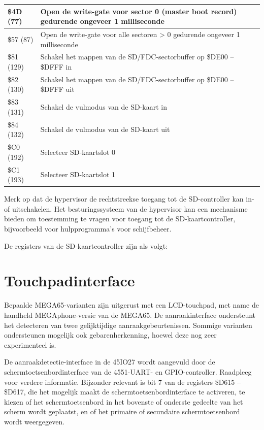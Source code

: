 \begin{longtable}{|L{2cm}|L{9cm}|}
\small \$4D (77) & Open de write-gate voor sector 0 (master boot record) gedurende ongeveer 1 milliseconde \\
 \hline
\small \$57 (87) & Open de write-gate voor alle sectoren > 0 gedurende ongeveer 1 milliseconde \\
 \hline
\small \$81 (129) & Schakel het mappen van de SD/FDC-sectorbuffer op \$DE00 -- \$DFFF in \\
 \hline
\small \$82 (130) & Schakel het mappen van de SD/FDC-sectorbuffer op \$DE00 -- \$DFFF uit \\
 \hline
\small \$83 (131) & Schakel de vulmodus van de SD-kaart in \\
 \hline
\small \$84 (132) & Schakel de vulmodus van de SD-kaart uit \\
 \hline
\small \$C0 (192) & Selecteer SD-kaartslot 0 \\
 \hline
\small \$C1 (193) & Selecteer SD-kaartslot 1 \\
 \hline
   \end{longtable}


Merk op dat de hypervisor de rechtstreekse toegang tot de SD-controller kan in- of uitschakelen. Het besturingssysteem van de hypervisor kan een mechanisme bieden om toestemming te vragen voor toegang tot de SD-kaartcontroller, bijvoorbeeld voor hulpprogramma's voor schijfbeheer.

De registers van de SD-kaartcontroller zijn als volgt:



\section{Touchpadinterface}

Bepaalde MEGA65-varianten zijn uitgerust met een LCD-touchpad, met name de handheld MEGAphone-versie van de MEGA65. De aanraakinterface ondersteunt het detecteren van twee gelijktijdige aanraakgebeurtenissen. Sommige varianten ondersteunen mogelijk ook gebarenherkenning, hoewel deze nog zeer experimenteel is.

De aanraakdetectie-interface in de 45IO27 wordt aangevuld door de schermtoetsenbordinterface van de 4551-UART- en GPIO-controller. Raadpleeg  voor verdere informatie. Bijzonder relevant is bit 7 van de registers \$D615 --\$D617, die het mogelijk maakt de schermtoetsenbordinterface te activeren, te kiezen of het schermtoetsenbord in het bovenste of onderste gedeelte van het scherm wordt geplaatst, en of het primaire of secundaire schermtoetsenbord wordt weergegeven.

